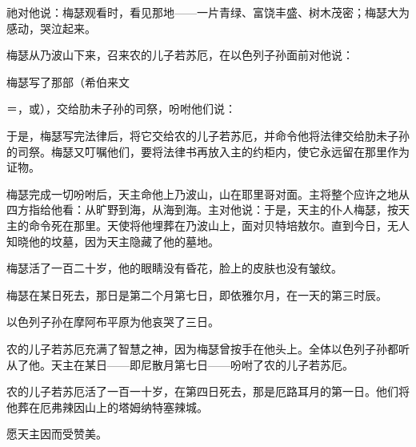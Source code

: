 祂对他说：梅瑟观看时，看见那地——一片青绿、富饶丰盛、树木茂密；梅瑟大为感动，哭泣起来。\par

梅瑟从乃波山下来，召来农的儿子若苏厄，在以色列子孙面前对他说：\par

梅瑟写了那部（希伯来文\par

＝，或），交给肋未子孙的司祭，吩咐他们说：\par

于是，梅瑟写完法律后，将它交给农的儿子若苏厄，并命令他将法律交给肋未子孙的司祭。梅瑟又叮嘱他们，要将法律书再放入主的约柜内，使它永远留在那里作为证物。\par

梅瑟完成一切吩咐后，天主命他上乃波山，山在耶里哥对面。主将整个应许之地从四方指给他看：从旷野到海，从海到海。主对他说：于是，天主的仆人梅瑟，按天主的命令死在那里。天使将他埋葬在乃波山上，面对贝特培敖尔。直到今日，无人知晓他的坟墓，因为天主隐藏了他的墓地。\par

梅瑟活了一百二十岁，他的眼睛没有昏花，脸上的皮肤也没有皱纹。\par

梅瑟在某日死去，那日是第二个月第七日，即依雅尔月，在一天的第三时辰。\par

以色列子孙在摩阿布平原为他哀哭了三日。\par

农的儿子若苏厄充满了智慧之神，因为梅瑟曾按手在他头上。全体以色列子孙都听从了他。天主在某日——即尼散月第七日——吩咐了农的儿子若苏厄。\par

农的儿子若苏厄活了一百一十岁，在第四日死去，那是厄路耳月的第一日。他们将他葬在厄弗辣因山上的塔姆纳特塞辣城。\par

愿天主因而受赞美。\par

